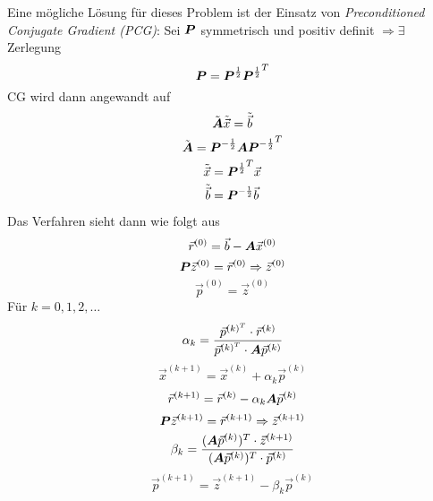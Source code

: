 Eine mögliche Lösung für dieses Problem ist der Einsatz von \emph{Preconditioned Conjugate Gradient (PCG)}: Sei $\boldsymbol {P}$ symmetrisch und positiv definit $\Rightarrow \exists$ Zerlegung
\begin{equation}
	\boldsymbol {P} = \boldsymbol {P}^\frac{1}{2} {\boldsymbol {P}^\frac{1}{2}}^T
\end{equation}
CG wird dann angewandt auf
\begin{equation}
	\tilde{\boldsymbol {A}} \tilde{\vec{x}} = \tilde{\vec{b}}
\end{equation}
\begin{equation}
	\tilde{\boldsymbol {A}} = \boldsymbol {P}^{-\frac{1}{2}} \boldsymbol {A} {\boldsymbol {P}^{-\frac{1}{2}}}^T
\end{equation}
\begin{equation}
	\tilde{\vec{x}} = {\boldsymbol {P}^\frac{1}{2}}^T \vec{x}
\end{equation}
\begin{equation}
	\tilde{\vec{b}} = \boldsymbol {P}^{-\frac{1}{2}} \vec{b}
\end{equation}

Das Verfahren sieht dann wie folgt aus
\begin{equation}
	\vec{r}^{(0)} = \vec{b} - \boldsymbol {A} \vec{x}^{(0)}
\end{equation}
\begin{equation}
	\boldsymbol {P} \vec{z}^{(0)} = \vec{r}^{(0)} \Rightarrow \vec{z}^{(0)}
\end{equation}
\begin{equation}
	\vec{p}^{(0)} = \vec{z}^{(0)}
\end{equation}
Für $k = 0, 1, 2, \ldots$
\begin{equation}
	\alpha_k = \frac{\vec{p}^{{(k)}^T} \cdot \vec{r}^{(k)}}{\vec{p}^{{(k)}^T} \cdot \boldsymbol {A} \vec{p}^{(k)}}
\end{equation}
\begin{equation}
	\vec{x}^{(k + 1)} = \vec{x}^{(k)} + \alpha_k \vec{p}^{(k)}
\end{equation}
\begin{equation}
	\vec{r}^{(k + 1)} = \vec{r}^{(k)} - \alpha_k \boldsymbol {A} \vec{p}^{(k)}
\end{equation}
\begin{equation}
	\boldsymbol {P} \vec{z}^{(k + 1)} = \vec{r}^{(k + 1)} \Rightarrow \vec{z}^{(k + 1)}
\end{equation}
\begin{equation}
	\beta_k = \frac{(\boldsymbol {A} \vec{p}^{(k)})^T \cdot \vec{z}^{(k + 1)}}{(\boldsymbol {A} \vec{p}^{(k)})^T \cdot \vec{p}^{(k)}}
\end{equation}
\begin{equation}
	\vec{p}^{(k + 1)} = \vec{z}^{(k + 1)} - \beta_k \vec{p}^{(k)}
\end{equation}
